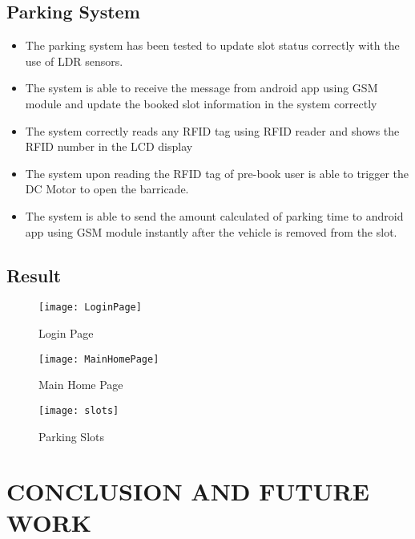 \documentclass[12pt,a4paper]{report}
\begin{document}
\section{Parking System}
\begin{itemize}
	\item The parking system has been tested to update slot status correctly with the use of LDR sensors.
	\item The system is able to receive the message from android app using GSM module and update the booked slot information in the system correctly
	\item The system correctly reads any RFID tag using RFID reader and shows the RFID number in the LCD display
	\item The system upon reading the RFID tag of pre-book user is able to trigger the DC Motor to open the barricade.
	\item The system is able to send the amount calculated of parking time to android app using GSM module instantly after the vehicle is removed from the slot.
\end{itemize}

\section{Result}
\begin{figure}[H]
	\begin{center}
		\texttt{[image: LoginPage]}
		\caption{Login Page}
	\end{center}
\end{figure}
\begin{figure}[H]
	\begin{center}
		\texttt{[image: MainHomePage]}
		\caption{Main Home Page}
	\end{center}
\end{figure}
\begin{figure}[H]
	\begin{center}
		\texttt{[image: slots]}
		\caption{Parking Slots}
	\end{center}
\end{figure}
\chapter{CONCLUSION AND FUTURE WORK}
\newpage
\end{document}
